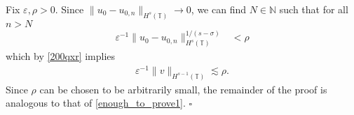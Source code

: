 \documentclass[12pt,reqno]{amsart}
\renewcommand{\qedsymbol}{\ensuremath{\square}}
\newcommand{\ci}{\mathbb{T}}
\newcommand{\ee}{\varepsilon}
\theoremstyle{plain}  %
\theoremstyle{definition}
\begin{document}
Fix $\ee, \rho > 0$. Since $\|u_0 -
u_{0,n} \|_{H^s(\ci)} \to 0$, we
can find $N \in \mathbb{N}$ such that for all $n > N$
%
%
\begin{equation*}
\begin{split}
\ee^{-1} \|u_0-u_{0,n}\|_{H^s(\ci)}^{1/(s-\sigma)}
& < \rho
\label{uniform_n}
\end{split}
\end{equation*}
%
%
which by \eqref{200qxr} implies
%
%
\begin{equation}
	\label{end-decay}
	\begin{split}
		\ee^{-1} \|v\|_{H^{s-1}(\ci)} \lesssim \rho.
	\end{split}
\end{equation}
%
%
%
%
Since $\rho$ can be chosen to be arbitrarily small, the remainder of the 
proof is analogous to that of \eqref{enough_to_prove1}. \qquad \qedsymbol
%
%
%
%
\end{document}
